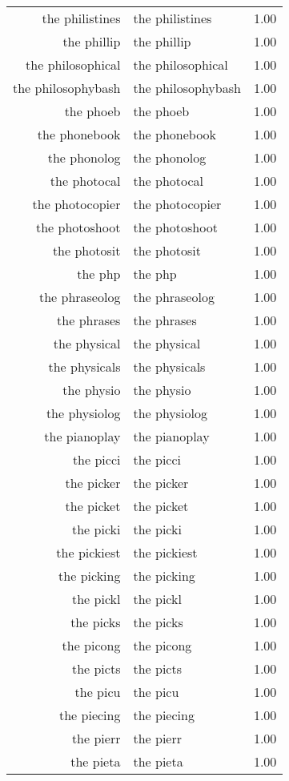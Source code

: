 \begin{table}[ht]
\begin{tabular}{rlr}
  the philistines & the philistines & 1.00 \\ 
  the phillip & the phillip & 1.00 \\ 
  the philosophical & the philosophical & 1.00 \\ 
  the philosophybash & the philosophybash & 1.00 \\ 
  the phoeb & the phoeb & 1.00 \\ 
  the phonebook & the phonebook & 1.00 \\ 
  the phonolog & the phonolog & 1.00 \\ 
  the photocal & the photocal & 1.00 \\ 
  the photocopier & the photocopier & 1.00 \\ 
  the photoshoot & the photoshoot & 1.00 \\ 
  the photosit & the photosit & 1.00 \\ 
  the php & the php & 1.00 \\ 
  the phraseolog & the phraseolog & 1.00 \\ 
  the phrases & the phrases & 1.00 \\ 
  the physical & the physical & 1.00 \\ 
  the physicals & the physicals & 1.00 \\ 
  the physio & the physio & 1.00 \\ 
  the physiolog & the physiolog & 1.00 \\ 
  the pianoplay & the pianoplay & 1.00 \\ 
  the picci & the picci & 1.00 \\ 
  the picker & the picker & 1.00 \\ 
  the picket & the picket & 1.00 \\ 
  the picki & the picki & 1.00 \\ 
  the pickiest & the pickiest & 1.00 \\ 
  the picking & the picking & 1.00 \\ 
  the pickl & the pickl & 1.00 \\ 
  the picks & the picks & 1.00 \\ 
  the picong & the picong & 1.00 \\ 
  the picts & the picts & 1.00 \\ 
  the picu & the picu & 1.00 \\ 
  the piecing & the piecing & 1.00 \\ 
  the pierr & the pierr & 1.00 \\ 
  the pieta & the pieta & 1.00 \\ 

\end{tabular}
\end{table}
